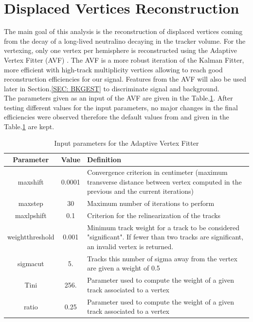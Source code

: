 \documentclass{cernatlasnote}
\begin{document}
\newpage
\section{Displaced Vertices Reconstruction}
\label{SEC: DISVTX}
    The main goal of this analysis is the reconstruction of displaced vertices coming from the decay of a long-lived neutralino decaying in the tracker volume. For the vertexing, only one vertex per hemisphere is reconstructed using the Adaptive Vertex Fitter (AVF) \cite{AVF}. The AVF is a more robust iteration of the Kalman Fitter, more efficient with high-track multiplicity vertices allowing to reach good reconstruction efficiencies for our signal. Features from the AVF will also be used later in Section.\ref{SEC: BKGEST} to discriminate signal and background.\\

    The parameters given as an input of the AVF are given in the Table.\ref{tab:AVFPARAMETERS}. After testing different values for the input parameters, no major changes in the final efficiencies were observed therefore the default values from \cite{AVF} and given in the Table.\ref{tab:AVFPARAMETERS} are kept.\\

            \begin{table}[h]
\centering
\begin{tabular}{|c|c|m{10 cm}|}
  \hline
  \rowcolor{lightgray} 
  Parameter & Value & Definition\\
  \hline
        maxshift & 0.0001 & Convergence criterion in centimeter (maximum transverse distance between vertex computed in the previous and the current iterations)\\
        \hline
        maxstep & 30 & Maximum number of iterations to perform\\
        \hline
        maxlpshift & 0.1 & Criterion for the relinearization of the tracks \\
        \hline
        weightthreshold & 0.001 & Minimum track weight for a track to be considered "significant". If fewer than two tracks are significant, an invalid vertex is returned.\\
        \hline
        sigmacut & 5. & Tracks this number of sigma away from the vertex are given a weight of 0.5\\
        \hline
        Tini & 256. & Parameter used to compute the weight of a given track associated to a vertex\\
        \hline
        ratio & 0.25 &  Parameter used to compute the weight of a given track associated to a vertex\\
  \hline
\end{tabular}
    \caption{Input parameters for the Adaptive Vertex Fitter}
    \label{tab:AVFPARAMETERS}
\end{table}
\end{document}
